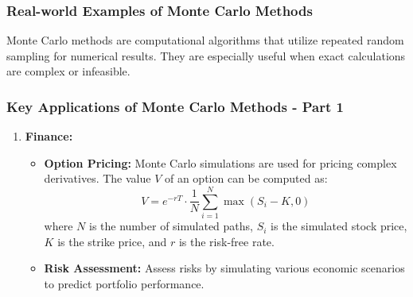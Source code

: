 \documentclass[aspectratio=169]{beamer}
\begin{document}
\begin{frame}[fragile]
    \frametitle{Real-world Examples of Monte Carlo Methods}
    Monte Carlo methods are computational algorithms that utilize repeated random sampling for numerical results. They are especially useful when exact calculations are complex or infeasible.
\end{frame}

\begin{frame}[fragile]
    \frametitle{Key Applications of Monte Carlo Methods - Part 1}
    \begin{enumerate}
        \item \textbf{Finance:}
            \begin{itemize}
                \item \textbf{Option Pricing:}
                    Monte Carlo simulations are used for pricing complex derivatives. The value \( V \) of an option can be computed as:
                    \begin{equation}
                    V = e^{-rT} \cdot \frac{1}{N} \sum_{i=1}^{N} \max(S_i - K, 0)
                    \end{equation}
                    where \( N \) is the number of simulated paths, \( S_i \) is the simulated stock price, \( K \) is the strike price, and \( r \) is the risk-free rate.
                    
                \item \textbf{Risk Assessment:}
                    Assess risks by simulating various economic scenarios to predict portfolio performance.
            \end{itemize}
    \end{enumerate}
\end{frame}
\end{document}
